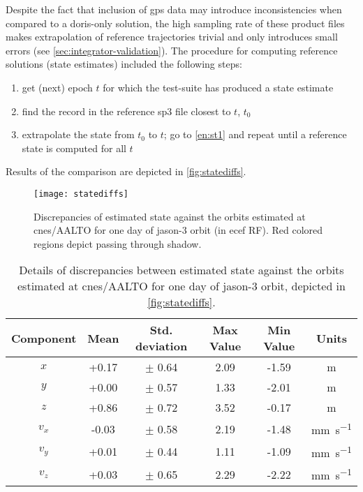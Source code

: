 Despite the fact that inclusion of \gls{gps} data may introduce inconsistencies 
when compared to a \gls{doris}-only solution, the high sampling rate of these 
product files makes extrapolation of reference trajectories trivial and only introduces 
small errors (see \autoref{sec:integrator-validation}). The procedure for computing 
reference solutions (state estimates) included the following steps:
\begin{enumerate}
  \item \label{en:st1} get (next) epoch $t$ for which the test-suite has produced a state estimate
  \item find the record in the reference sp3 file closest to $t$, $t_0$
  \item extrapolate the state from $t_0$ to $t$; go to \autoref{en:st1} and repeat 
    until a reference state is computed for all $t$
\end{enumerate}

Results of the comparison are depicted in \autoref{fig:statediffs}.
\begin{figure}
    \centering
    \texttt{[image: statediffs]}
    \caption{Discrepancies of estimated state against the orbits estimated at \gls{cnes}/AALTO for one day of \gls{jason}-3 orbit (in \gls{ecef} RF). Red colored regions depict passing through shadow.}
    \label{fig:statediffs}
\end{figure}

\begin{table}[h!]
    \centering
    \begin{tabularx}{\textwidth}{cccccc}
        \toprule
        \textbf{Component} & \textbf{Mean} & \textbf{Std. deviation} & \textbf{Max Value} & \textbf{Min Value} & \textbf{Units}\\
        \hline
        $x$   &  +0.17 & $\pm$ 0.64 & 2.09 & -1.59 & \si{\metre}\\
        $y$   &  +0.00 & $\pm$ 0.57 & 1.33 & -2.01 & \si{\metre}\\
        $z$   &  +0.86 & $\pm$ 0.72 & 3.52 & -0.17 & \si{\metre}\\
        $v_x$ &  -0.03 & $\pm$ 0.58 & 2.19 & -1.48 & \si{\milli\metre\per\second}\\
        $v_y$ &  +0.01 & $\pm$ 0.44 & 1.11 & -1.09 & \si{\milli\metre\per\second}\\
        $v_z$ &  +0.03 & $\pm$ 0.65 & 2.29 & -2.22 & \si{\milli\metre\per\second}\\
       \bottomrule
    \end{tabularx}
    \caption{Details of discrepancies between estimated state against the orbits estimated at \gls{cnes}/AALTO for one day of \gls{jason}-3 orbit, depicted in \autoref{fig:statediffs}.}
    \label{table:statediffs}
\end{table}

